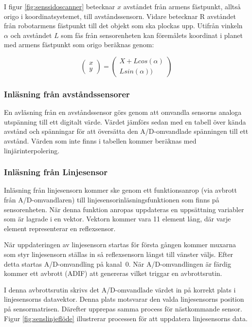 I figur \ref{fig:senssidoscanner} betecknar $x$ avståndet från armens fästpunkt, alltså origo i koordinatsystemet, till avståndssensorn. Vidare betecknar R avståndet från robotarmens fästpunkt till det objekt som ska plockas upp. Utifrån vinkeln $\alpha$ och avståndet $L$ som fås från sensorenheten kan föremålets koordinat i planet med armens fästpunkt som origo beräknas genom:

$$\begin{pmatrix}
x \\ y
\end{pmatrix}
 = 
\begin{pmatrix}
X+L cos(\alpha) \\ 
L sin(\alpha))
\end{pmatrix}$$


\subsubsection{Inläsning från avståndssensorer}
En avläsning från en avståndssensor görs genom att omvandla sensorns analoga utspänning till ett digitalt värde.  Värdet jämförs sedan med en tabell över kända avstånd och spänningar för att översätta den A/D-omvandlade spänningen till ett avstånd. Värden som inte finns i tabellen kommer beräknas med linjärinterpolering. 

\subsubsection{Inläsning från Linjesensor}

Inläsning från linjesensorn kommer ske genom ett funktionsanrop (via avbrott från A/D-omvandlaren) till linjesensorinläsningsfunktionen som finns på sensorenheten. När denna funktion anropas uppdateras en uppsättning variabler som är lagrade i en vektor. Vektorn kommer vara 11 element lång, där varje element representerar en reflexsensor.

När uppdateringen av linjesensorn startas för första gången kommer muxarna som styr linjesensorn ställas in så reflexsensorn längst till vänster väljs. Efter detta startas A/D-omvandling på kanal~0. När A/D-omvandlingen är färdig kommer ett avbrott (ADIF) att genereras vilket triggar en avbrottsrutin.

I denna avbrottsrutin skrivs det A/D-omvandlade värdet in på korrekt plats i linjesensorns datavektor. Denna plats motsvarar den valda linjesensorns position på sensormatrisen. Därefter upprepas samma process för nästkommande sensor. Figur \ref{fig:senslinjeflöde} illustrerar processen för att uppdatera linjesensorns data.

